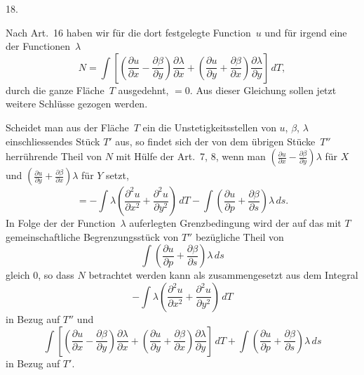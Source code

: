 \documentclass[a4paper,12pt]{article}
\begin{document}
\medbreak

\centerline{18.}

\nobreak\medskip

Nach Art.~16 haben wir f\"{u}r die dort festgelegte Function~$u$
und f\"{u}r irgend eine der Functionen~$\lambda$
\[ N = \int 
      \left[
         \left(
            \frac{\partial u     }{\partial x}
          - \frac{\partial \beta }{\partial y}
         \right) \frac{\partial \lambda}{\partial x}
       + \left(
            \frac{\partial u     }{\partial y}
          + \frac{\partial \beta }{\partial x}
         \right) \frac{\partial \lambda}{\partial y}
      \right] \, dT,\]
durch die ganze Fl\"{a}che~$T$ ausgedehnt, $= 0$.  Aus dieser
Gleichung sollen jetzt weitere Schl\"{u}sse gezogen werden.

Scheidet man aus der Fl\"{a}che~$T$ ein die Unstetigkeitsstellen
von $u$, $\beta$, $\lambda$ einschliessendes St\"{u}ck $T'$ aus,
so findet sich der von dem \"{u}brigen St\"{u}cke~$T''$
herr\"{u}hrende Theil von $N$ mit H\"{u}lfe der Art.~7, 8, wenn
man
$\displaystyle
   \left(
      \frac{\partial u     }{\partial x}
    - \frac{\partial \beta }{\partial y}
   \right) \lambda$
f\"{u}r $X$ und
$\displaystyle
   \left(
      \frac{\partial u     }{\partial y}
    + \frac{\partial \beta }{\partial x}
   \right) \lambda$
f\"{u}r $Y$ setzt,
\[ = - \int \lambda
            \left(
               \frac{\partial^2 u}{\partial x^2}
             + \frac{\partial^2 u}{\partial y^2}
            \right) \, dT
     - \int
            \left(
               \frac{\partial u     }{\partial p}
             + \frac{\partial \beta }{\partial s}
            \right) \lambda \, ds.\]
In Folge der der Function~$\lambda$ auferlegten Grenzbedingung
wird der auf das mit $T$ gemeinschaftliche Begrenzungsst\"{u}ck
von $T''$ bez\"{u}gliche Theil von
\[     \int \left(
               \frac{\partial u     }{\partial p}
             + \frac{\partial \beta }{\partial s}
            \right) \lambda \, ds \]
gleich $0$, so dass $N$ betrachtet werden kann als
zusammengesetzt aus dem Integral
\[   - \int \lambda
            \left(
               \frac{\partial^2 u}{\partial x^2}
             + \frac{\partial^2 u}{\partial y^2}
            \right) \, dT \]
in Bezug auf $T''$ und
\[ \int
      \left[
         \left(
            \frac{\partial u     }{\partial x}
          - \frac{\partial \beta }{\partial y}
         \right) \frac{\partial \lambda}{\partial x}
       + \left(
            \frac{\partial u     }{\partial y}
          + \frac{\partial \beta }{\partial x}
         \right) \frac{\partial \lambda}{\partial y}
      \right] \, dT
   + \int
            \left(
               \frac{\partial u     }{\partial p}
             + \frac{\partial \beta }{\partial s}
            \right) \lambda \, ds \]
in Bezug auf $T'$.
\end{document}
